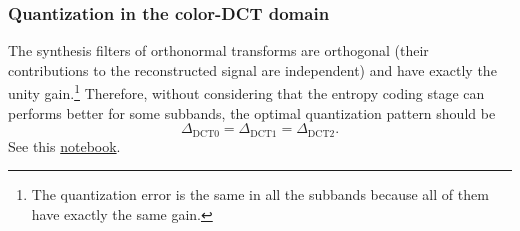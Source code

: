 \begin{comment}
For example, the
2x2-\href{https://en.wikipedia.org/wiki/Karhunen-Loeve_theorem}{KLT}~\cite{sayood2017introduction}
is defined by
\begin{equation}
  \begin{bmatrix}
    {\mathbf{y}}_0 \\
    {\mathbf{y}}_1
  \end{bmatrix}
  = 
  \begin{bmatrix} \frac{1}{\sqrt{2}} & \frac{1}{\sqrt{2}} \\ \frac{1}{\sqrt{2}} & \frac{-1}{\sqrt{2}} \end{bmatrix}
  \begin{bmatrix}
    {\mathbf{x}}_0 \\
    {\mathbf{x}}_1
  \end{bmatrix},
  \label{eq:KLT_transform}
\end{equation}
and it holds that
\begin{equation}
  \mathbf{K}={\mathbf{K}}^{-1}={\mathbf{K}}^{\text T},
  \label{eq:orthogonal_matrix}
\end{equation}
where ${\mathbf{K}}^{\text T}$ represents the transpose matrix of
$\mathbf{K}$.  Eq.~\ref{eq:orthogonal_matrix} is true for all
\href{https://en.wikipedia.org/wiki/Orthogonality}{orthogonal}
transforms, and therefore
\begin{equation}
  \langle {\mathbf{K}}_i, {\mathbf{K}}_j\rangle = 0, \forall i\neq j.
\end{equation}
\end{comment}

\subsubsection{Quantization in the color-DCT domain}
The synthesis filters of orthonormal transforms are orthogonal (their
contributions to the reconstructed signal are independent) and have
exactly the unity gain.\footnote{The quantization error is the same in
all the subbands because all of them have exactly the same gain.}
Therefore, without considering that the entropy coding stage can
performs better for some subbands, the optimal quantization pattern
should be
\begin{equation}
  \Delta_{\text{DCT0}} = \Delta_{\text{DCT1}} = \Delta_{\text{DCT2}}.
\end{equation}
See this \href{https://github.com/Sistemas-Multimedia/Sistemas-Multimedia.github.io/blob/master/study_guide/06-color_transform/color-DCT_compression.ipynb}{notebook}.

